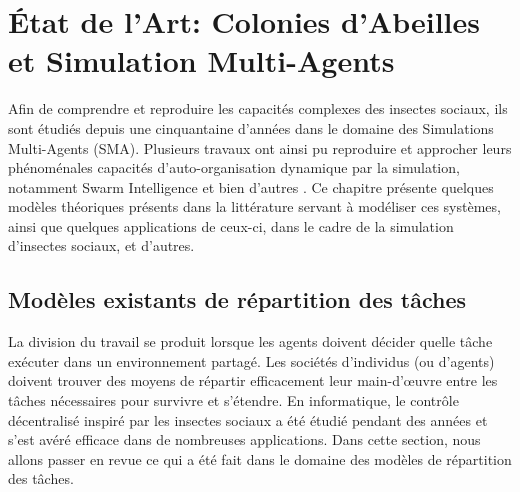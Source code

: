 \chapter{État de l'Art: Colonies d'Abeilles et Simulation Multi-Agents}

	Afin de comprendre et reproduire les capacités complexes des insectes sociaux, ils sont étudiés depuis une cinquantaine d'années dans le domaine des Simulations Multi-Agents (SMA). Plusieurs travaux ont ainsi pu reproduire et approcher leurs phénoménales capacités d'auto-organisation dynamique par la simulation, notamment Swarm Intelligence \cite{bonabeau_natural_1999} et bien d'autres \cite{drogoul_simulation_1993, schmickl_taskselsim_2008, dornhaus_task_1998}. Ce chapitre présente quelques modèles théoriques présents dans la littérature servant à modéliser ces systèmes, ainsi que quelques applications de ceux-ci, dans le cadre de la simulation d'insectes sociaux, et d'autres.
			
			
	\section{Modèles existants de répartition des tâches}
	La division du travail se produit lorsque les agents doivent décider quelle tâche exécuter dans un environnement partagé. Les sociétés d'individus (ou d'agents) doivent trouver des moyens de répartir efficacement leur main-d'œuvre entre les tâches nécessaires pour survivre et s'étendre. En informatique, le contrôle décentralisé inspiré par les insectes sociaux a été étudié pendant des années et s'est avéré efficace dans de nombreuses applications. Dans cette section, nous allons passer en revue ce qui a été fait dans le domaine des modèles de répartition des tâches.
	
	
